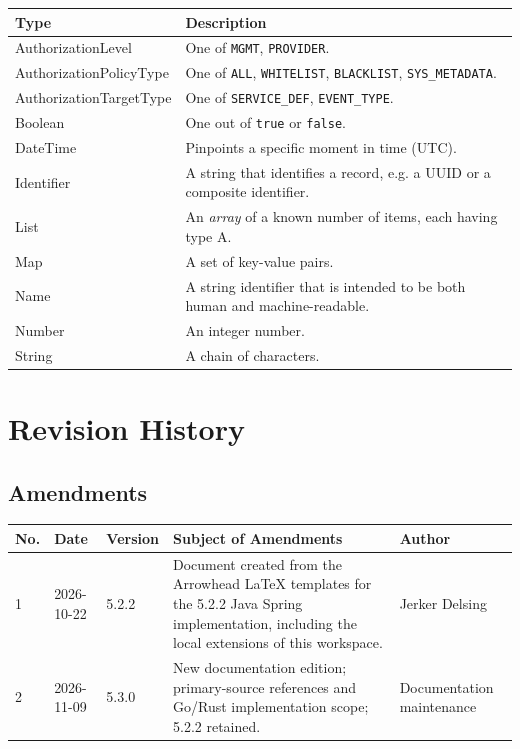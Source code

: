 \documentclass[a4paper]{arrowhead}
\newcommand{\pdef}[1]{{\textcolor{ArrowheadGrey}{#1\label{sec:model:primitives:#1}\label{sec:model:primitives:#1s}\label{sec:model:primitives:#1es}}}}
\begin{document}
\noindent\begin{tabularx}{\textwidth}{| p{4.6cm} | X |} \hline
\rowcolor{gray!33} Type & Description \\ \hline
\pdef{AuthorizationLevel} & One of \texttt{MGMT}, \texttt{PROVIDER}. \\ \hline
\pdef{AuthorizationPolicyType} & One of \texttt{ALL}, \texttt{WHITELIST}, \texttt{BLACKLIST}, \texttt{SYS\_\allowbreak{}METADATA}. \\ \hline
\pdef{AuthorizationTargetType} & One of \texttt{SERVICE\_\allowbreak{}DEF}, \texttt{EVENT\_\allowbreak{}TYPE}. \\ \hline
\pdef{Boolean} & One out of \texttt{true} or \texttt{false}. \\ \hline
\pdef{DateTime} & Pinpoints a specific moment in time (UTC). \\ \hline
\pdef{Identifier} & A string that identifies a record, e.g. a UUID or a composite identifier. \\ \hline
\pdef{List} & An \textit{array} of a known number of items, each having type A. \\ \hline
\pdef{Map} & A set of key-value pairs. \\ \hline
\pdef{Name} & A string identifier that is intended to be both human and machine-readable. \\ \hline
\pdef{Number} & An integer number. \\ \hline
\pdef{String} & A chain of characters. \\ \hline
\end{tabularx}

\newpage




\newpage

\section{Revision History}
\subsection{Amendments}

\noindent\begin{tabularx}{\textwidth}{| p{1cm} | p{3cm} | p{2cm} | X | p{4cm} |} \hline
\rowcolor{gray!33} No. & Date & Version & Subject of Amendments & Author \\ \hline

1 & 2026-10-22 & 5.2.2 & Document created from the Arrowhead LaTeX templates for the 5.2.2 Java Spring implementation, including the local extensions of this workspace. & Jerker Delsing \\ \hline
2 & 2026-11-09 & 5.3.0 & New documentation edition; primary-source references and Go/Rust implementation scope; 5.2.2 retained. & Documentation maintenance \\ \hline
\end{tabularx}
\end{document}
